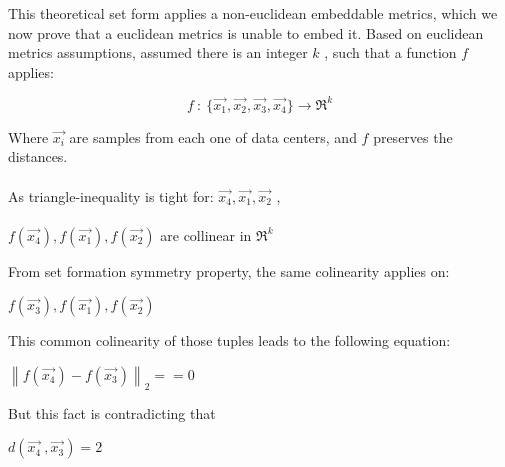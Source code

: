 	This theoretical set form applies a non-euclidean embeddable metrics, which we now prove that a euclidean metrics is unable to embed it.
	Based on euclidean metrics assumptions, assumed there is an integer $k$ , such that a function $f$ applies:
	
	\begin{equation}
	f \: : \: \{  \overrightarrow{x_1}, \overrightarrow{x_2} , \overrightarrow{x_3} , \overrightarrow{x_4}\} \rightarrow \Re^k
	\end{equation}
	
	Where $\overrightarrow{x_i}$ are samples from each one of data centers, and $f$ preserves the distances. \\ \\
	
    As triangle-inequality is tight for: $\overrightarrow{x_4} , \overrightarrow{x_1} , \overrightarrow{x_2}$ ,\\ \\
	
	$f(\overrightarrow{x_4}) ,f(\overrightarrow{x_1}) ,f(\overrightarrow{x_2})$ are collinear in $\Re^k$
	
	From set formation symmetry property, the same colinearity applies on:
	
	$f(\overrightarrow{x_3}) ,f(\overrightarrow{x_1}) ,f(\overrightarrow{x_2})$
	
	This common colinearity of those tuples leads to the following equation:
	
	$\left \| f(\overrightarrow{x_4}) - f(\overrightarrow{x_3})  \right \|_2 == 0$
	
	But this fact is contradicting that 
	
	$ d(\overrightarrow{x_4}\ , \overrightarrow{x_3}) = 2 $
	
	
	





	




